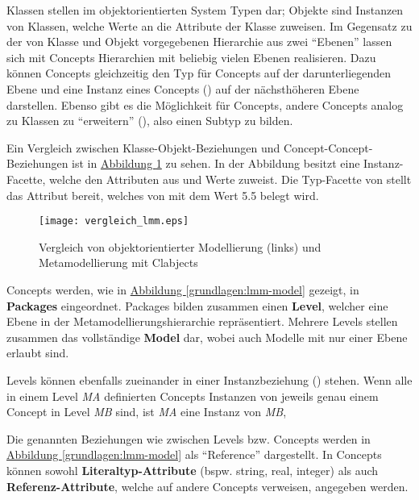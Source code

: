 \documentclass[a4paper,10pt]{sphinxmanual}
\begin{document}
Klassen stellen im objektorientierten System Typen dar; Objekte sind Instanzen von Klassen, welche Werte an die Attribute der Klasse zuweisen.
Im Gegensatz zu der von Klasse und Objekt vorgegebenen Hierarchie aus zwei "`Ebenen"' lassen sich mit Concepts Hierarchien mit beliebig vielen Ebenen realisieren.
Dazu können Concepts gleichzeitig den Typ für Concepts auf der darunterliegenden Ebene und eine Instanz eines Concepts () auf der nächsthöheren Ebene darstellen.
Ebenso gibt es die Möglichkeit für Concepts, andere Concepts analog zu Klassen zu "`erweitern"' (), also einen Subtyp zu bilden.

Ein Vergleich zwischen Klasse-Objekt-Beziehungen und Concept-Concept-Beziehungen  ist in \hyperref[grundlagen:vergleich-lmm]{Abbildung  \ref*{grundlagen:vergleich-lmm}} zu sehen.
In der Abbildung besitzt  eine Instanz-Facette, welche den Attributen aus  und  Werte zuweist.
Die Typ-Facette von  stellt das Attribut  bereit, welches von  mit dem Wert 5.5 belegt wird.
\begin{figure}[htbp]
\centering
\capstart

\texttt{[image: vergleich\_lmm.eps]}
\caption{Vergleich von objektorientierter Modellierung (links) und Metamodellierung mit Clabjects}\label{grundlagen:vergleich-lmm}\end{figure}

Concepts werden, wie in \hyperref[grundlagen:lmm-model]{Abbildung  \ref*{grundlagen:lmm-model}} gezeigt, in \textbf{Packages} eingeordnet. Packages bilden zusammen einen \textbf{Level}, welcher eine Ebene in der Metamodellierungshierarchie repräsentiert.
Mehrere Levels stellen zusammen das vollständige \textbf{Model} dar, wobei auch Modelle mit nur einer Ebene erlaubt sind.

Levels können ebenfalls zueinander in einer Instanzbeziehung () stehen.
Wenn alle in einem Level \emph{MA} definierten Concepts Instanzen von jeweils genau einem Concept in Level \emph{MB} sind, ist \emph{MA} eine Instanz von \emph{MB},

Die genannten Beziehungen wie  zwischen Levels bzw. Concepts werden in \hyperref[grundlagen:lmm-model]{Abbildung  \ref*{grundlagen:lmm-model}} als "`Reference"' dargestellt.
In Concepts können sowohl \textbf{Literaltyp-Attribute} (bspw. string, real, integer) als auch \textbf{Referenz-Attribute}, welche auf andere Concepts verweisen, angegeben werden.
\end{document}
